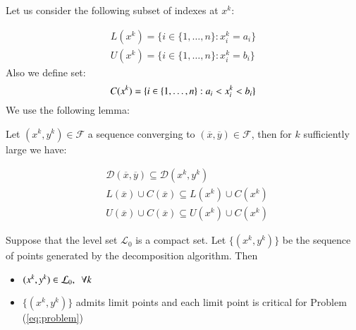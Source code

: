 Let us consider the following subset of indexes at $x^k$:

\begin{equation}\label{eq:sets}
 \begin{aligned}
   L(x^k) =\{ i \in\{1,\ldots,n \}: x^k_i = a_i\}\\
  U(x^k) =\{i \in\{1,\ldots,n \} : x^k_i = b_i\}
 \end{aligned}
\end{equation}
Also we define set:
\begin{equation}
 C(x^k)=\{ i \in\{1,\ldots,n \}: a_i<x^k_i < b_i\}\\
\end{equation}
We use the following lemma:
\begin{lemma}\label{lem:direction}
 Let ${(x^k,y^k)} \in \mathcal{F}$ a sequence converging to $(\overline{x},\overline{y}) \in \mathcal{F}$, then for $k$ sufficiently large we have:
 
 \begin{subequations}
 \begin{align}
& \mathcal{D}(\overline{x},\overline{y}) \subseteq \mathcal{D}(x^k,y^k)\\
&L(\overline{x})\cup C(\overline{x})  \subseteq L(x^k)\cup C(x^k)\\
&U(\overline{x})\cup C(\overline{x})  \subseteq U(x^k)\cup C(x^k)
\end{align}
 \end{subequations}

\end{lemma}

\begin{proposition}
Suppose that the level set $\mathcal{L}_0$ is a compact set. Let $\{(x^k, y^k)\}$ be the sequence of points generated by the decomposition algorithm. Then
\begin{itemize}
\item $(x^k, y^k) \in \mathcal{L}_0, \enskip \forall k$ 
\item  $\{(x^k, y^k)\}$ admits limit points and each limit point is critical for Problem (\ref{eq:problem})
\end{itemize}
\end{proposition}

